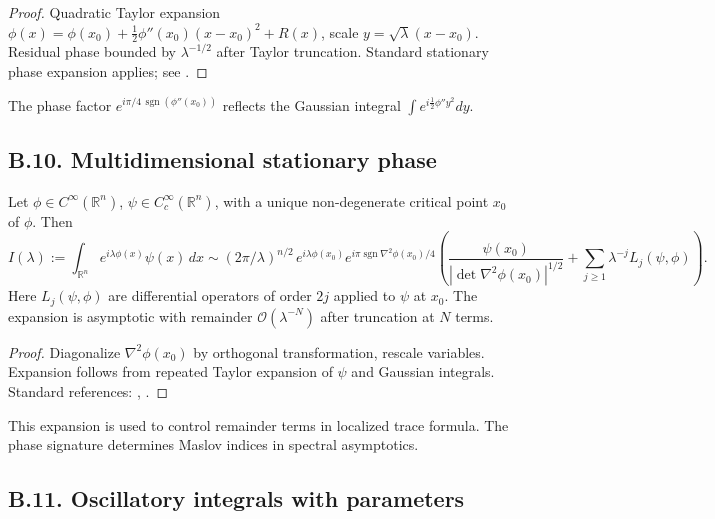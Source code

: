 \begin{proof}
Quadratic Taylor expansion $\phi(x)=\phi(x_0)+\frac{1}{2}\phi''(x_0)(x-x_0)^2+R(x)$, scale $y=\sqrt{\lambda}(x-x_0)$. Residual phase bounded by $\lambda^{-1/2}$ after Taylor truncation. Standard stationary phase expansion applies; see \cite[Thm.~7.7.5]{HormanderVolI}.
\end{proof}

\begin{remark}
The phase factor $e^{i\pi/4\,\operatorname{sgn}(\phi''(x_0))}$ reflects the Gaussian integral $\int e^{i \tfrac12 \phi'' y^2}dy$.
\end{remark}

\subsection*{B.10. Multidimensional stationary phase}
\label{appB:stationaryMulti}

\begin{theorem}
\label{thm:stationaryMulti}
Let $\phi\in C^\infty(\mathbb{R}^n)$, $\psi\in C_c^\infty(\mathbb{R}^n)$, with a unique non-degenerate critical point $x_0$ of $\phi$. Then
\[
I(\lambda) := \int_{\mathbb{R}^n} e^{i\lambda \phi(x)} \psi(x)\, dx
\sim (2\pi/\lambda)^{n/2}\,
e^{i\lambda \phi(x_0)} e^{i\pi \operatorname{sgn} \nabla^2 \phi(x_0)/4}
\left( \frac{\psi(x_0)}{|\det \nabla^2 \phi(x_0)|^{1/2}} + \sum_{j\ge1} \lambda^{-j} L_j(\psi,\phi) \right).
\]
Here $L_j(\psi,\phi)$ are differential operators of order $2j$ applied to $\psi$ at $x_0$. The expansion is asymptotic with remainder $\mathcal{O}(\lambda^{-N})$ after truncation at $N$ terms.
\end{theorem}

\begin{proof}
Diagonalize $\nabla^2\phi(x_0)$ by orthogonal transformation, rescale variables. Expansion follows from repeated Taylor expansion of $\psi$ and Gaussian integrals. Standard references: \cite[Ch.~7]{HormanderVolI}, \cite[Ch.~VIII]{SteinHA}.
\end{proof}

\begin{remark}
This expansion is used to control remainder terms in localized trace formula. The phase signature determines Maslov indices in spectral asymptotics.
\end{remark}

\subsection*{B.11. Oscillatory integrals with parameters}
\label{appB:oscillatory-params}

